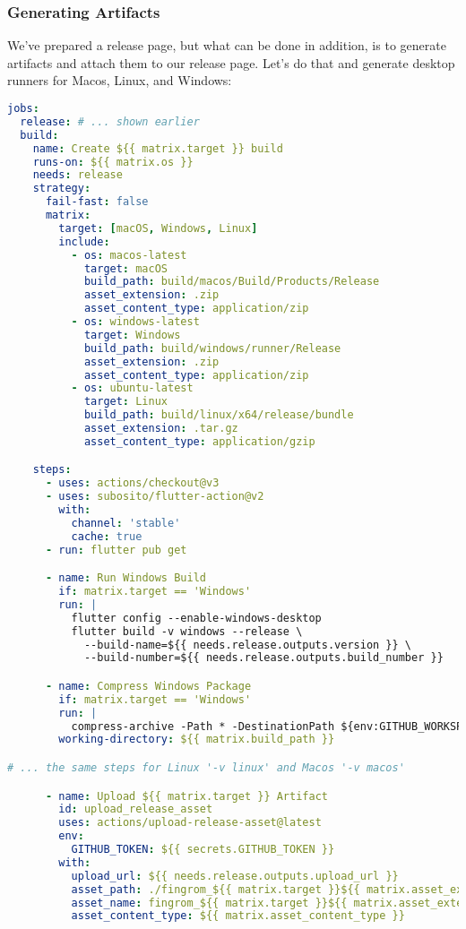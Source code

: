 \subsubsection{Generating Artifacts}

We've prepared a release page, but what can be done in addition, is to generate artifacts and attach them to our release
page. Let's do that and generate desktop runners for Macos, Linux, and Windows:

\begin{lstlisting}[language=yaml]
jobs:
  release: # ... shown earlier
  build:
    name: Create ${{ matrix.target }} build
    runs-on: ${{ matrix.os }}
    needs: release
    strategy:
      fail-fast: false
      matrix:
        target: [macOS, Windows, Linux]
        include:
          - os: macos-latest
            target: macOS
            build_path: build/macos/Build/Products/Release
            asset_extension: .zip
            asset_content_type: application/zip
          - os: windows-latest
            target: Windows
            build_path: build/windows/runner/Release
            asset_extension: .zip
            asset_content_type: application/zip
          - os: ubuntu-latest
            target: Linux
            build_path: build/linux/x64/release/bundle
            asset_extension: .tar.gz
            asset_content_type: application/gzip

    steps:
      - uses: actions/checkout@v3
      - uses: subosito/flutter-action@v2
        with:
          channel: 'stable'
          cache: true
      - run: flutter pub get

      - name: Run Windows Build 
        if: matrix.target == 'Windows'
        run: |
          flutter config --enable-windows-desktop
          flutter build -v windows --release \
            --build-name=${{ needs.release.outputs.version }} \
            --build-number=${{ needs.release.outputs.build_number }}

      - name: Compress Windows Package
        if: matrix.target == 'Windows'
        run: |
          compress-archive -Path * -DestinationPath ${env:GITHUB_WORKSPACE}/fingrom_${{ matrix.target }}${{ matrix.asset_extension }}
        working-directory: ${{ matrix.build_path }}

# ... the same steps for Linux '-v linux' and Macos '-v macos'

      - name: Upload ${{ matrix.target }} Artifact
        id: upload_release_asset
        uses: actions/upload-release-asset@latest
        env:
          GITHUB_TOKEN: ${{ secrets.GITHUB_TOKEN }}
        with:
          upload_url: ${{ needs.release.outputs.upload_url }}
          asset_path: ./fingrom_${{ matrix.target }}${{ matrix.asset_extension }}
          asset_name: fingrom_${{ matrix.target }}${{ matrix.asset_extension }}
          asset_content_type: ${{ matrix.asset_content_type }}
\end{lstlisting}
